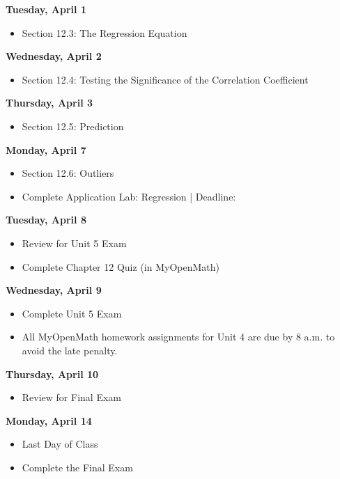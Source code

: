\documentclass[11pt]{article}
\begin{document}
\textbf{Tuesday, April 1}

\begin{itemize}
\item Section 12.3: The Regression Equation
\end{itemize}

\textbf{Wednesday, April 2}

\begin{itemize}
\item Section 12.4: Testing the Significance of the Correlation Coefficient
\end{itemize}

\textbf{Thursday, April 3}

\begin{itemize}
\item Section 12.5: Prediction
\end{itemize}

\textbf{Monday, April 7}

\begin{itemize}
\item Section 12.6: Outliers
\item Complete Application Lab: Regression | Deadline:
\end{itemize}

\textbf{Tuesday, April 8}

\begin{itemize}
\item Review for Unit 5 Exam
\item Complete Chapter 12 Quiz (in MyOpenMath)
\end{itemize}

\textbf{Wednesday, April 9}

\begin{itemize}
\item Complete Unit 5 Exam
\item All MyOpenMath homework assignments for Unit 4 are due by 8 a.m. to avoid the late penalty.
\end{itemize}

\textbf{Thursday, April 10}

\begin{itemize}
\item Review for Final Exam
\end{itemize}

\textbf{Monday, April 14}

\begin{itemize}
\item Last Day of Class
\item Complete the Final Exam
\end{itemize}
\end{document}
